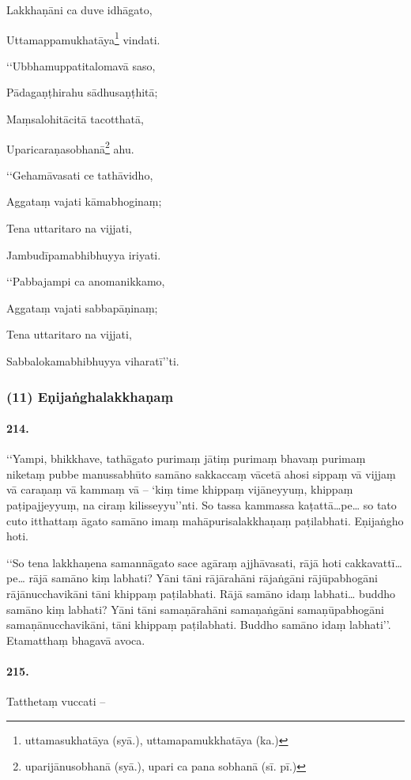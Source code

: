 Lakkhaṇāni ca duve idhāgato,

Uttamappamukhatāya\footnote{uttamasukhatāya (syā.), uttamapamukkhatāya (ka.)} vindati.

‘‘Ubbhamuppatitalomavā saso,

Pādagaṇṭhirahu sādhusaṇṭhitā;

Maṃsalohitācitā tacotthatā,

Uparicaraṇasobhanā\footnote{uparijānusobhanā (syā.), upari ca pana sobhanā (sī. pī.)} ahu.

‘‘Gehamāvasati ce tathāvidho,

Aggataṃ vajati kāmabhoginaṃ;

Tena uttaritaro na vijjati,

Jambudīpamabhibhuyya iriyati.

‘‘Pabbajampi ca anomanikkamo,

Aggataṃ vajati sabbapāṇinaṃ;

Tena uttaritaro na vijjati,

Sabbalokamabhibhuyya viharatī’’ti.

\subsubsection{(11) Eṇijaṅghalakkhaṇaṃ}

\paragraph{214.} ‘‘Yampi, bhikkhave, tathāgato purimaṃ jātiṃ purimaṃ bhavaṃ purimaṃ niketaṃ pubbe manussabhūto samāno sakkaccaṃ vācetā ahosi sippaṃ vā vijjaṃ vā caraṇaṃ vā kammaṃ vā – ‘kiṃ time khippaṃ vijāneyyuṃ, khippaṃ paṭipajjeyyuṃ, na ciraṃ kilisseyyu’’nti. So tassa kammassa kaṭattā…pe… so tato cuto itthattaṃ āgato samāno imaṃ mahāpurisalakkhaṇaṃ paṭilabhati. Eṇijaṅgho hoti.

‘‘So tena lakkhaṇena samannāgato sace agāraṃ ajjhāvasati, rājā hoti cakkavattī…pe… rājā samāno kiṃ labhati? Yāni tāni rājārahāni rājaṅgāni rājūpabhogāni rājānucchavikāni tāni khippaṃ paṭilabhati. Rājā samāno idaṃ labhati… buddho samāno kiṃ labhati? Yāni tāni samaṇārahāni samaṇaṅgāni samaṇūpabhogāni samaṇānucchavikāni, tāni khippaṃ paṭilabhati. Buddho samāno idaṃ labhati’’. Etamatthaṃ bhagavā avoca.

\paragraph{215.} Tatthetaṃ vuccati –


